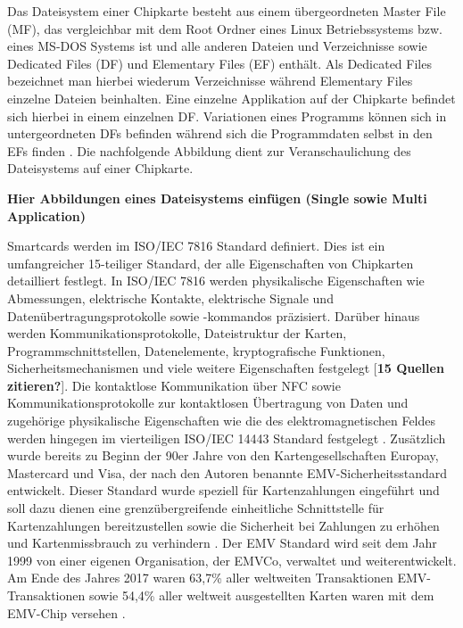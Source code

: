   Das Dateisystem einer Chipkarte besteht aus einem übergeordneten Master File (MF), das vergleichbar mit dem Root Ordner eines Linux Betriebssystems bzw. eines MS-DOS Systems ist und alle anderen Dateien und Verzeichnisse sowie Dedicated Files (DF) und Elementary Files (EF) enthält. Als Dedicated Files bezeichnet man hierbei wiederum Verzeichnisse während Elementary Files einzelne Dateien beinhalten. Eine einzelne Applikation auf der Chipkarte befindet sich hierbei in einem einzelnen DF. Variationen eines Programms können sich in untergeordneten DFs befinden während sich die Programmdaten selbst in den EFs finden \cite{smartcasedElectricity}. 
  Die nachfolgende Abbildung dient zur Veranschaulichung des Dateisystems auf einer Chipkarte. 
  
  \begin{center}
  	\textbf{Hier Abbildungen eines Dateisystems einfügen (Single sowie Multi Application)}
  \end{center}
 
Smartcards werden im ISO/IEC 7816 Standard definiert. Dies ist ein umfangreicher 15-teiliger Standard, der alle Eigenschaften von Chipkarten detailliert festlegt. In ISO/IEC 7816 werden physikalische Eigenschaften wie Abmessungen, elektrische Kontakte, elektrische Signale und Datenübertragungsprotokolle sowie -kommandos präzisiert. Darüber hinaus werden Kommunikationsprotokolle, Dateistruktur der Karten, Programmschnittstellen, Datenelemente, kryptografische Funktionen, Sicherheitsmechanismen und viele weitere Eigenschaften festgelegt [\textbf{15 Quellen zitieren?}]. Die kontaktlose Kommunikation über NFC sowie Kommunikationsprotokolle zur kontaktlosen Übertragung von Daten und zugehörige physikalische Eigenschaften wie die des elektromagnetischen Feldes werden hingegen im vierteiligen ISO/IEC 14443 Standard festgelegt \cite{iso14443-1, iso14443-2, iso14443-3,  iso14443-4}. Zusätzlich wurde bereits zu Beginn der 90er Jahre von den Kartengesellschaften Europay, Mastercard und Visa, der nach den Autoren benannte EMV-Sicherheitsstandard entwickelt. Dieser Standard wurde speziell für Kartenzahlungen eingeführt und soll dazu dienen eine grenzübergreifende einheitliche Schnittstelle für Kartenzahlungen bereitzustellen sowie die Sicherheit bei Zahlungen zu erhöhen und Kartenmissbrauch zu verhindern \cite{oenbSepa, emvChip}. Der EMV Standard wird seit dem Jahr 1999 von einer eigenen Organisation, der EMVCo, verwaltet und weiterentwickelt. Am Ende des Jahres 2017 waren 63,7\% aller weltweiten Transaktionen EMV-Transaktionen sowie 54,4\% aller weltweit ausgestellten Karten waren mit dem EMV-Chip versehen \cite{emvco}.

